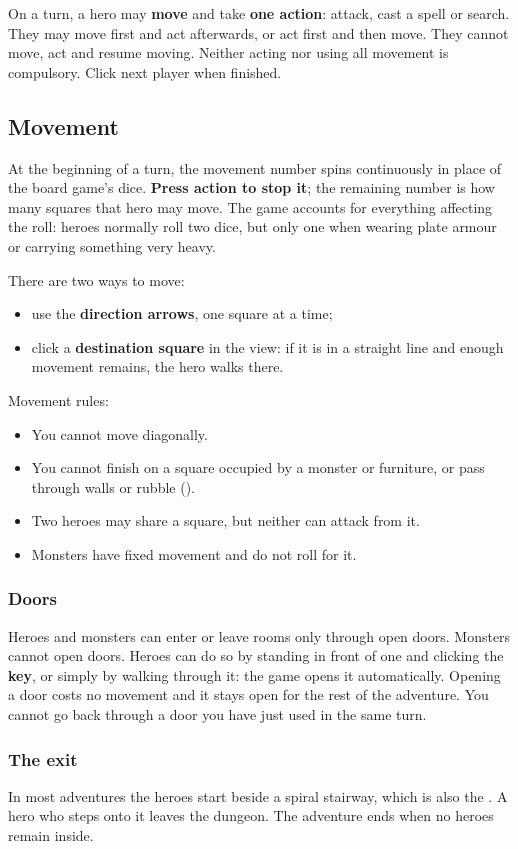 On a turn, a hero may \textbf{move} and take \textbf{one action}: attack, cast a spell or search. They may move first and act afterwards, or act first and then move. They cannot move, act and resume moving. Neither acting nor using all movement is compulsory. Click next player when finished.
\subsection{Movement}
At the beginning of a turn, the movement number spins continuously in place of the board game's dice. \textbf{Press action to stop it}; the remaining number is how many squares that hero may move. The game accounts for everything affecting the roll: heroes normally roll two dice, but only one when wearing plate armour or carrying something very heavy.

There are two ways to move:
\begin{itemize}
\item use the \textbf{direction arrows}, one square at a time;
\item click a \textbf{destination square} in the view: if it is in a straight line and enough movement remains, the hero walks there.
\end{itemize}
Movement rules:
\begin{itemize}
\item You cannot move diagonally.
\item You cannot finish on a square occupied by a monster or furniture, or pass through walls or rubble ().
\item Two heroes may share a square, but neither can attack from it.
\item Monsters have fixed movement and do not roll for it.
\end{itemize}
\subsubsection*{Doors}
Heroes and monsters can enter or leave rooms only through open doors. Monsters cannot open doors. Heroes can do so by standing in front of one and clicking the \textbf{key}, or simply by walking through it: the game opens it automatically. Opening a door costs no movement and it stays open for the rest of the adventure. You cannot go back through a door you have just used in the same turn.
\subsubsection*{The exit}
In most adventures the heroes start beside a spiral stairway, which is also the . A hero who steps onto it leaves the dungeon. The adventure ends when no heroes remain inside.
